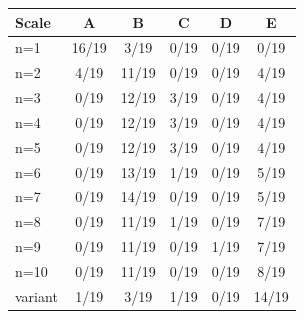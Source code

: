\begin{tabular}{lccccc}
\toprule
Scale & \cellcolor[HTML]{FFFFFF} A & \cellcolor[HTML]{D55E00} B & \cellcolor[HTML]{E69F00} C & \cellcolor[HTML]{009E73} D & \cellcolor[HTML]{56B4E9} E \\
\midrule
n=1 & \cellcolor[HTML]{FFFFFF} 16/19 & \cellcolor[HTML]{D55E00} 3/19 & \cellcolor[HTML]{E69F00} 0/19 & \cellcolor[HTML]{009E73} 0/19 & \cellcolor[HTML]{56B4E9} 0/19 \\
n=2 & \cellcolor[HTML]{FFFFFF} 4/19 & \cellcolor[HTML]{D55E00} 11/19 & \cellcolor[HTML]{E69F00} 0/19 & \cellcolor[HTML]{009E73} 0/19 & \cellcolor[HTML]{56B4E9} 4/19 \\
n=3 & \cellcolor[HTML]{FFFFFF} 0/19 & \cellcolor[HTML]{D55E00} 12/19 & \cellcolor[HTML]{E69F00} 3/19 & \cellcolor[HTML]{009E73} 0/19 & \cellcolor[HTML]{56B4E9} 4/19 \\
n=4 & \cellcolor[HTML]{FFFFFF} 0/19 & \cellcolor[HTML]{D55E00} 12/19 & \cellcolor[HTML]{E69F00} 3/19 & \cellcolor[HTML]{009E73} 0/19 & \cellcolor[HTML]{56B4E9} 4/19 \\
n=5 & \cellcolor[HTML]{FFFFFF} 0/19 & \cellcolor[HTML]{D55E00} 12/19 & \cellcolor[HTML]{E69F00} 3/19 & \cellcolor[HTML]{009E73} 0/19 & \cellcolor[HTML]{56B4E9} 4/19 \\
n=6 & \cellcolor[HTML]{FFFFFF} 0/19 & \cellcolor[HTML]{D55E00} 13/19 & \cellcolor[HTML]{E69F00} 1/19 & \cellcolor[HTML]{009E73} 0/19 & \cellcolor[HTML]{56B4E9} 5/19 \\
n=7 & \cellcolor[HTML]{FFFFFF} 0/19 & \cellcolor[HTML]{D55E00} 14/19 & \cellcolor[HTML]{E69F00} 0/19 & \cellcolor[HTML]{009E73} 0/19 & \cellcolor[HTML]{56B4E9} 5/19 \\
n=8 & \cellcolor[HTML]{FFFFFF} 0/19 & \cellcolor[HTML]{D55E00} 11/19 & \cellcolor[HTML]{E69F00} 1/19 & \cellcolor[HTML]{009E73} 0/19 & \cellcolor[HTML]{56B4E9} 7/19 \\
n=9 & \cellcolor[HTML]{FFFFFF} 0/19 & \cellcolor[HTML]{D55E00} 11/19 & \cellcolor[HTML]{E69F00} 0/19 & \cellcolor[HTML]{009E73} 1/19 & \cellcolor[HTML]{56B4E9} 7/19 \\
n=10 & \cellcolor[HTML]{FFFFFF} 0/19 & \cellcolor[HTML]{D55E00} 11/19 & \cellcolor[HTML]{E69F00} 0/19 & \cellcolor[HTML]{009E73} 0/19 & \cellcolor[HTML]{56B4E9} 8/19 \\
variant & \cellcolor[HTML]{FFFFFF} 1/19 & \cellcolor[HTML]{D55E00} 3/19 & \cellcolor[HTML]{E69F00} 1/19 & \cellcolor[HTML]{009E73} 0/19 & \cellcolor[HTML]{56B4E9} 14/19 \\
\bottomrule
\end{tabular}
